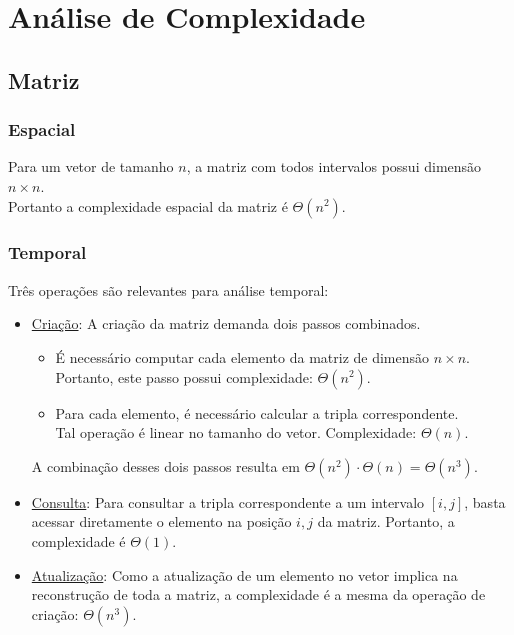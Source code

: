 \documentclass{article}
\begin{document}
\section{Análise de Complexidade}

\subsection{Matriz}
\subsubsection{Espacial}
Para um vetor de tamanho $n$, a matriz com todos intervalos possui dimensão $n \times n$. \\
Portanto a complexidade espacial da matriz é $\Theta(n^2)$.

\subsubsection{Temporal}
Três operações são relevantes para análise temporal:
\vspace{-5pt}
\begin{itemize}
  \item \uline{Criação}: A criação da matriz demanda dois passos combinados.
        \begin{itemize}
          \item É necessário computar cada elemento da matriz de dimensão $n \times n$.\\
                Portanto, este passo possui complexidade: $\Theta(n^2)$.
          \item Para cada elemento, é necessário calcular a tripla correspondente. \\
                Tal operação é linear no tamanho do vetor. Complexidade: $\Theta(n)$.
        \end{itemize}
        A combinação desses dois passos resulta em $\Theta(n^2) \cdot \Theta(n) = \Theta(n^3)$.
  
  \item \uline{Consulta}: Para consultar a tripla correspondente a um intervalo $[i, j]$, basta acessar diretamente o elemento na posição $i, j$ da matriz. Portanto, a complexidade é $\Theta(1)$.
  
  \item \uline{Atualização}: Como a atualização de um elemento no vetor implica na reconstrução de toda a matriz, a complexidade é a mesma da operação de criação: $\Theta(n^3)$.
\end{itemize}
\end{document}
